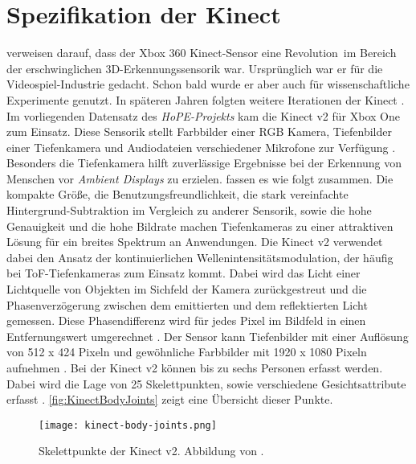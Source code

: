 \section{Spezifikation der Kinect}
\label{2-SpezifikationKinect}
\citep{tolgyessy_evaluation_2021} verweisen darauf,
dass der Xbox 360 Kinect-Sensor eine \glqq Revolution\grqq\ im Bereich der erschwinglichen 3D-Erkennungssensorik war.
Ursprünglich war er für die Videospiel-Industrie gedacht.
Schon bald wurde er aber auch für wissenschaftliche Experimente genutzt.
In späteren Jahren folgten weitere Iterationen der Kinect \citep{tolgyessy_evaluation_2021}.
Im vorliegenden Datensatz des \emph{HoPE-Projekts} kam die Kinect v2 für Xbox One zum Einsatz.
Diese Sensorik stellt Farbbilder einer \ac{RGB} Kamera, Tiefenbilder einer Tiefenkamera
und Audiodateien verschiedener Mikrofone zur Verfügung \citep{windows-developer-center_microsoft_corporation_human_2014}.
Besonders die Tiefenkamera hilft zuverlässige Ergebnisse bei der Erkennung von Menschen vor \emph{Ambient Displays} zu erzielen.
\citet{li_time-flight_2014} fassen es wie folgt zusammen.
Die kompakte Größe, die Benutzungsfreundlichkeit,
die stark vereinfachte Hintergrund-Subtraktion im Vergleich zu anderer Sensorik, sowie die hohe Genauigkeit
und die hohe Bildrate machen Tiefenkameras zu einer attraktiven Lösung für ein breites Spektrum an Anwendungen.
Die Kinect v2 verwendet dabei den Ansatz der kontinuierlichen Wellenintensitätsmodulation,
der häufig bei \ac{ToF}-Tiefenkameras zum Einsatz kommt.
Dabei wird das Licht einer Lichtquelle von Objekten im Sichfeld der Kamera zurückgestreut
und die Phasenverzögerung zwischen dem emittierten und dem reflektierten Licht gemessen.
Diese Phasendifferenz wird für jedes Pixel im Bildfeld in einen Entfernungswert umgerechnet \citep{tolgyessy_evaluation_2021}.
Der Sensor kann Tiefenbilder mit einer Auflösung von 512 x 424 Pixeln
und gewöhnliche Farbbilder mit 1920 x 1080 Pixeln aufnehmen \citep{marin_multi-camera_2019}.
Bei der Kinect v2 können bis zu sechs Personen erfasst werden.
Dabei wird die Lage von 25 Skelettpunkten, sowie verschiedene Gesichtsattribute erfasst \citep{windows-developer-center_microsoft_corporation_human_2014}.
\autoref{fig:KinectBodyJoints} zeigt eine Übersicht dieser Punkte. 

\begin{figure}[ht]
  \begin{center}
  \texttt{[image: kinect-body-joints.png]}
  \end{center}
  \caption{Skelettpunkte der Kinect v2. Abbildung von \citet{windows-developer-center_microsoft_corporation_human_2014}.}
  \label{fig:KinectBodyJoints}
\end{figure}


